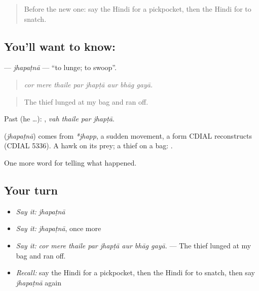\label{lesson:HI-C289-jhapatna}



\begin{quote}
Before the new one: say the Hindi for a pickpocket, then the Hindi for to snatch.
\end{quote}

\subsection*{You'll want to know: }
\textbf{} — \emph{jhapaṭnā} — \textquotedblleft{}to lunge; to swoop\textquotedblright{}.

\begin{quote}
       
\end{quote}

\begin{quote}
\emph{cor mere thaile par jhapṭā aur bhāg gayā.}
\end{quote}

\begin{quote}
The thief lunged at my bag and ran off.
\end{quote}

Past (he …):    , \emph{vah thaile par jhapṭā}.

\begin{cousinweb}
\textbf{} (\emph{jhapaṭnā}) comes from \emph{*jhapp}, a sudden movement, a form CDIAL reconstructs (CDIAL 5336). A hawk \textbf{ } on its prey; a thief \textbf{ } on a bag: \textbf{  }.
\end{cousinweb}

\begin{grammarlens}[title={What you've built}]
One more word for telling what happened.
\end{grammarlens}

\subsection*{Your turn}
\begin{itemize}
\raggedright
  \item \emph{Say it:} \emph{jhapaṭnā}
  \item \emph{Say it:} \emph{jhapaṭnā}, once more
  \item \emph{Say it:} \emph{cor mere thaile par jhapṭā aur bhāg gayā.} — The thief lunged at my bag and ran off.
  \item \emph{Recall:} say the Hindi for a pickpocket, then the Hindi for to snatch, then say \emph{jhapaṭnā} again
\end{itemize}

